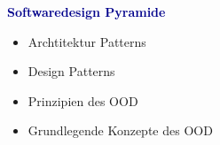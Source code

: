 \textbf{\textcolor{darkblue}{ Softwaredesign Pyramide}}~
\begin{itemize}
	\item Archtitektur Patterns
	\item Design Patterns
	\item Prinzipien des OOD
	\item Grundlegende Konzepte des OOD
	
\end{itemize}



